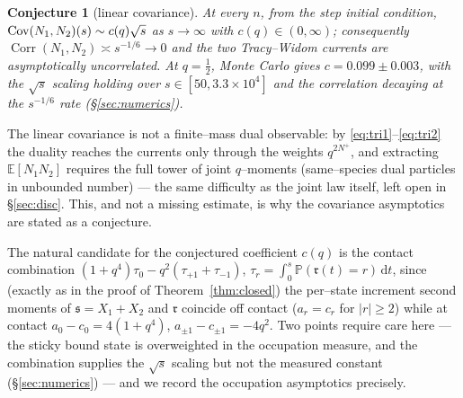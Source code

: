 \documentclass[11pt]{article}
\theoremstyle{plain}
\newtheorem{conjecture}[theorem]{Conjecture}
\theoremstyle{definition}
\theoremstyle{remark}
\DeclareMathOperator{\Corr}{Corr}\DeclareMathOperator{\cum}{cum}
\newcommand{\E}{\mathbb{E}}\newcommand{\PP}{\mathbb{P}}\newcommand{\dd}{\,\mathrm{d}}
\begin{document}
\begin{conjecture}[linear covariance]\label{conj:cov}
At every $n$, from the step initial condition,
$\operatorname{Cov}(N_1,N_2)(s)\sim c(q)\sqrt s$ as $s\to\infty$ with $c(q)\in(0,\infty)$;
consequently $\Corr(N_1,N_2)\asymp s^{-1/6}\to0$ and the two Tracy--Widom currents
are asymptotically uncorrelated. At $q=\tfrac12$, Monte Carlo gives
$c=0.099\pm0.003$, with the $\sqrt s$ scaling holding over
$s\in[50,3.3\times10^4]$ and the correlation decaying at the $s^{-1/6}$ rate
(\S\ref{sec:numerics}).
\end{conjecture}

The linear covariance is not a finite--mass dual observable: by
\eqref{eq:tri1}--\eqref{eq:tri2} the duality reaches the currents only through the
weights $q^{2N^+}$, and extracting $\E[N_1N_2]$ requires the full tower of joint
$q$--moments (same--species dual particles in unbounded number) --- the same
difficulty as the joint law itself, left open in \S\ref{sec:disc}. This, and not a
missing estimate, is why the covariance asymptotics are stated as a conjecture.

The natural candidate for the conjectured coefficient $c(q)$ is the contact
combination
$(1+q^4)\tau_0-q^2(\tau_{+1}+\tau_{-1})$, $\tau_r=\int_0^s\PP(\mathfrak r(t)=r)\dd t$,
since (exactly as in the proof of Theorem~\ref{thm:closed}) the per--state increment
second moments of $\mathfrak s=X_1+X_2$ and $\mathfrak r$ coincide off contact
($a_r=c_r$ for $|r|\ge2$) while at contact $a_0-c_0=4(1+q^4)$,
$a_{\pm1}-c_{\pm1}=-4q^2$. Two points require care here --- the sticky bound state is
overweighted in the occupation measure, and the combination supplies the $\sqrt s$
scaling but not the measured constant (\S\ref{sec:numerics}) --- and we record the
occupation asymptotics precisely.
\end{document}
